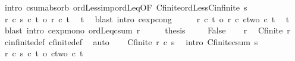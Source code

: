 \begin{isabellebody}
\ {\isacharparenleft}{\kern0pt}intro\ csum{\isacharunderscore}{\kern0pt}absorb{}\ ordLess{\isacharunderscore}{\kern0pt}imp{\isacharunderscore}{\kern0pt}ordLeq{\isacharbrackleft}{\kern0pt}OF\ Cfinite{\isacharunderscore}{\kern0pt}ordLess{\isacharunderscore}{\kern0pt}Cinfinite{\isacharbrackright}{\kern0pt}\ s{\isacharparenright}{\kern0pt}\isanewline
\ \ \isamarkupfalse%
\ {\isachardoublequoteopen}{\isacharparenleft}{\kern0pt}r\ {\isacharplus}{\kern0pt}c\ s{\isacharparenright}{\kern0pt}\ {\isacharcircum}{\kern0pt}c\ t\ {\isacharequal}{\kern0pt}o\ r\ {\isacharcircum}{\kern0pt}c\ t{\isachardoublequoteclose}\ \isamarkupfalse%
\ t\ \isamarkupfalse%
\ {\isacharparenleft}{\kern0pt}blast\ intro{\isacharcolon}{\kern0pt}\ cexp{\isacharunderscore}{\kern0pt}cong{}{\isacharparenright}{\kern0pt}\isanewline
\ \ \isamarkupfalse%
\ \isamarkupfalse%
\ {\isachardoublequoteopen}r\ {\isacharcircum}{\kern0pt}c\ t\ {\isasymle}o\ {\isacharparenleft}{\kern0pt}r\ {\isacharplus}{\kern0pt}c\ ctwo{\isacharparenright}{\kern0pt}\ {\isacharcircum}{\kern0pt}c\ t{\isachardoublequoteclose}\ \isamarkupfalse%
\ t\ \isamarkupfalse%
\ {\isacharparenleft}{\kern0pt}blast\ intro{\isacharcolon}{\kern0pt}\ cexp{\isacharunderscore}{\kern0pt}mono{}\ ordLeq{\isacharunderscore}{\kern0pt}csum{}\ r{\isacharparenright}{\kern0pt}\isanewline
\ \ \isamarkupfalse%
\ \isamarkupfalse%
\ {\isacharquery}{\kern0pt}thesis\ \isacommand{{\isachardot}{\kern0pt}}\isamarkupfalse%
\isanewline
{}\isamarkupfalse%
\isanewline
\ \ \isamarkupfalse%
\ False\isanewline
\ \ \isamarkupfalse%
\ r\ \isamarkupfalse%
\ {\isachardoublequoteopen}Cfinite\ r{\isachardoublequoteclose}\ \isamarkupfalse%
\ cinfinite{\isacharunderscore}{\kern0pt}def\ cfinite{\isacharunderscore}{\kern0pt}def\ \isamarkupfalse%
\ auto\isanewline
\ \ \isamarkupfalse%
\ {\isachardoublequoteopen}Cfinite\ {\isacharparenleft}{\kern0pt}r\ {\isacharplus}{\kern0pt}c\ s{\isacharparenright}{\kern0pt}{\isachardoublequoteclose}\ \isamarkupfalse%
\ {\isacharparenleft}{\kern0pt}intro\ Cfinite{\isacharunderscore}{\kern0pt}csum\ s{\isacharparenright}{\kern0pt}\isanewline
\ \ \isamarkupfalse%
\ {\isachardoublequoteopen}{\isacharparenleft}{\kern0pt}r\ {\isacharplus}{\kern0pt}c\ s{\isacharparenright}{\kern0pt}\ {\isacharcircum}{\kern0pt}c\ t\ {\isasymle}o\ ctwo\ {\isacharcircum}{\kern0pt}c\ t{\isachardoublequoteclose}\ \isamarkupfalse%

\end{isabellebody}
